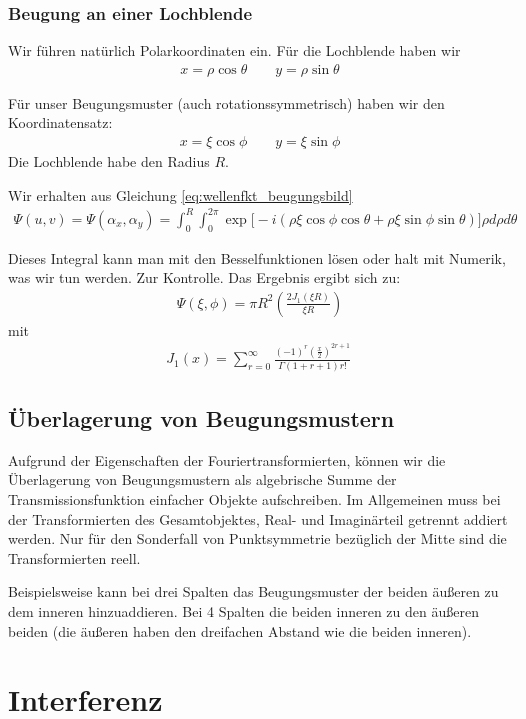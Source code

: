 \documentclass[a4paper]{article}
\begin{document}
\subsubsection{Beugung an einer Lochblende}
Wir führen natürlich Polarkoordinaten ein. Für die Lochblende haben wir
\begin{align}
x= \rho \cos \theta \qquad y = \rho \sin \theta
\end{align}

Für unser Beugungsmuster (auch rotationssymmetrisch) haben wir den Koordinatensatz:
\begin{align}
x= \xi \cos \phi \qquad y= \xi \sin \phi
\end{align}
Die Lochblende habe den Radius $R$.

Wir erhalten aus Gleichung \ref{eq:wellenfkt_beugungsbild}
\begin{align}
\Psi(u,v)=\Psi(\alpha_x,\alpha_y) = \int_0^R \int_0^{2\pi} \exp\Big[ -i (\rho \xi \cos\phi\cos\theta + \rho\xi\sin\phi\sin\theta) \Big] \rho d\rho d\theta
\end{align}

Dieses Integral kann man mit den Besselfunktionen lösen oder halt mit Numerik, was wir tun werden.
Zur Kontrolle. Das Ergebnis ergibt sich zu:
\begin{align}
\Psi (\xi,\phi ) = \pi R^2 \left( \frac{2J_1(\xi R)}{\xi R} \right)
\end{align}
mit 
\begin{align}
J_{1}(x)=\sum _{{r=0}}^{\infty }{\frac  {(-1)^{r}({\frac  {x}{2}})^{{2r+1 }}}{\Gamma (1 +r+1)r!}}\, 
\end{align}
\subsection{Überlagerung von Beugungsmustern}
Aufgrund der Eigenschaften der Fouriertransformierten, können wir die Überlagerung von Beugungsmustern als algebrische Summe der Transmissionsfunktion einfacher Objekte aufschreiben. Im Allgemeinen muss bei der Transformierten des Gesamtobjektes, Real- und Imaginärteil getrennt addiert werden. Nur für den Sonderfall von Punktsymmetrie bezüglich der Mitte sind die Transformierten reell. 

Beispielsweise kann bei drei Spalten das Beugungsmuster der beiden äußeren zu dem inneren hinzuaddieren. Bei 4 Spalten die beiden inneren zu den äußeren beiden (die äußeren haben den dreifachen Abstand wie die beiden inneren).
\section{Interferenz}
\end{document}
